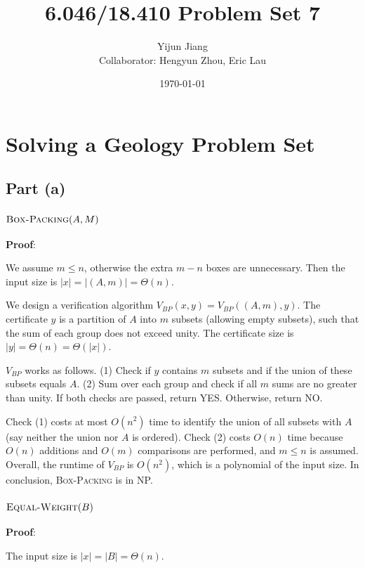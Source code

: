 \documentclass{article}
\title{6.046/18.410 Problem Set 7}
\author{Yijun Jiang\vspace{3pt}\\Collaborator: Hengyun Zhou, Eric Lau}
\date{\today}
\begin{document}
\maketitle

\section{Solving a Geology Problem Set}
\subsection{Part (a)}
\subsubsection{$\textsc{Box-Packing}(A,M)$}
\noindent\textbf{Proof}:

We assume $m\leqslant n$, otherwise the extra $m-n$ boxes are unnecessary. Then the input size is $|x|=|(A,m)|=\Theta(n)$.

We design a verification algorithm $V_{BP}(x,y)=V_{BP}((A,m),y)$. The certificate $y$ is a partition of $A$ into $m$ subsets (allowing empty subsets), such that the sum of each group does not exceed unity. The certificate size is $|y|=\Theta(n)=\Theta(|x|)$.

$V_{BP}$ works as follows. (1) Check if $y$ contains $m$ subsets and if the union of these subsets equals $A$. (2) Sum over each group and check if all $m$ sums are no greater than unity. If both checks are passed, return YES. Otherwise, return NO.

Check (1) costs at most $O(n^2)$ time to identify the union of all subsets with $A$ (say neither the union nor $A$ is ordered). Check (2) costs $O(n)$ time because $O(n)$ additions and $O(m)$ comparisons are performed, and $m\leqslant n$ is assumed. Overall, the runtime of $V_{BP}$ is $O(n^2)$, which is a polynomial of the input size. In conclusion, \textsc{Box-Packing} is in NP.


\subsubsection{$\textsc{Equal-Weight}(B)$}
\noindent\textbf{Proof}:

The input size is $|x|=|B|=\Theta(n)$.
\end{document}
